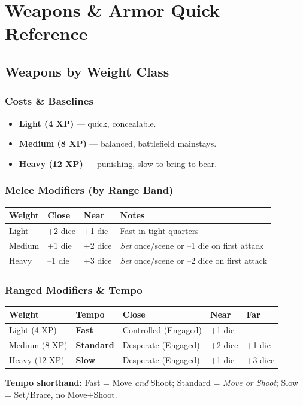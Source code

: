 \newpage
\section{Weapons \& Armor Quick Reference}\label{sec:weapons_armor_ref}

\subsection{Weapons by Weight Class}
\subsubsection{Costs \& Baselines}
\begin{itemize}
    \item \textbf{Light (4 XP)} --- quick, concealable.
    \item \textbf{Medium (8 XP)} --- balanced, battlefield mainstays.
    \item \textbf{Heavy (12 XP)} --- punishing, slow to bring to bear.
\end{itemize}

\subsubsection{Melee Modifiers (by Range Band)}
\begin{center}
\begin{longtable}{llll}
\toprule
\textbf{Weight} & \textbf{Close} & \textbf{Near} & \textbf{Notes} \\
\midrule
Light  & +2 dice & +1 die & Fast in tight quarters \\
Medium & +1 die & +2 dice & \emph{Set} once/scene or --1 die on first attack \\
Heavy  & --1 die & +3 dice & \emph{Set} once/scene or --2 dice on first attack \\
\bottomrule
\end{longtable}
\end{center}

\subsubsection{Ranged Modifiers \& Tempo}
\begin{center}
\begin{longtable}{lllll}
\toprule
\textbf{Weight} & \textbf{Tempo} & \textbf{Close} & \textbf{Near} & \textbf{Far} \\
\midrule
Light (4 XP) & \textbf{Fast} & Controlled (Engaged) & +1 die & --- \\
Medium (8 XP) & \textbf{Standard} & Desperate (Engaged) & +2 dice & +1 die \\
Heavy (12 XP) & \textbf{Slow} & Desperate (Engaged) & +1 die & +3 dice \\
\bottomrule
\end{longtable}
\end{center}
\textbf{Tempo shorthand:} Fast = Move \emph{and} Shoot; Standard = \emph{Move or Shoot}; Slow = Set/Brace, no Move+Shoot.

